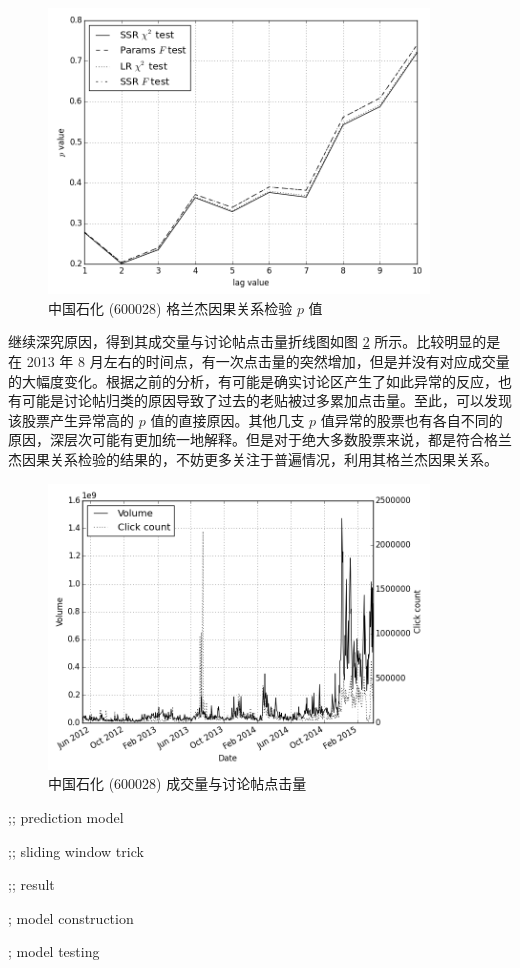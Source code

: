 \begin{figure}
  \centering
  \includegraphics[width=0.9\textwidth]{plots/granger_causality_test_on_sse_50_abnormal_granger.png}
  \caption{中国石化 (600028) 格兰杰因果关系检验 $p$ 值}
  \label{granger_causality_test_on_sse_50_abnormal:1}
\end{figure}

继续深究原因，得到其成交量与讨论帖点击量折线图如图 \ref{granger_causality_test_on_sse_50_abnormal:2} 所示。比较明显的是在 2013 年 8 月左右的时间点，有一次点击量的突然增加，但是并没有对应成交量的大幅度变化。根据之前的分析，有可能是确实讨论区产生了如此异常的反应，也有可能是讨论帖归类的原因导致了过去的老贴被过多累加点击量。至此，可以发现该股票产生异常高的 $p$ 值的直接原因。其他几支 $p$ 值异常的股票也有各自不同的原因，深层次可能有更加统一地解释。但是对于绝大多数股票来说，都是符合格兰杰因果关系检验的结果的，不妨更多关注于普遍情况，利用其格兰杰因果关系。

\begin{figure}
  \centering
  \includegraphics[width=0.9\textwidth]{plots/granger_causality_test_on_sse_50_abnormal_plot.png}
  \caption{中国石化 (600028) 成交量与讨论帖点击量}
  \label{granger_causality_test_on_sse_50_abnormal:2}
\end{figure}

;; prediction model

;; sliding window trick

;; result

; model construction

; model testing
